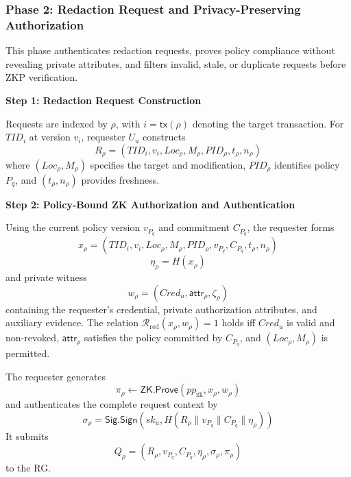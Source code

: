 \documentclass[lettersize,journal]{IEEEtran}
\begin{document}
\subsubsection*{\textbf{Phase 2: Redaction Request and Privacy-Preserving Authorization}}
\label{sec:phase2}

This phase authenticates redaction requests, proves policy compliance
without revealing private attributes, and filters invalid, stale, or
duplicate requests before ZKP verification.

\smallskip
\noindent\textbf{Step 1: Redaction Request Construction}

Requests are indexed by $\rho$, with $i=\mathsf{tx}(\rho)$ denoting the
target transaction. For $TID_i$ at version $v_i$, requester $U_u$ constructs
\begin{equation}
R_\rho=
(TID_i,v_i,Loc_\rho,M_\rho,PID_\rho,t_\rho,n_\rho)
\label{eq:redaction-request}
\end{equation}
where $(Loc_\rho,M_\rho)$ specifies the target and modification,
$PID_\rho$ identifies policy $P_q$, and $(t_\rho,n_\rho)$ provides
freshness.

\smallskip
\noindent\textbf{Step 2: Policy-Bound ZK Authorization and Authentication}

Using the current policy version $v_{P_q}$ and commitment $C_{P_q}$,
the requester forms
\begin{equation}
x_\rho
=(TID_i,v_i,Loc_\rho,M_\rho,PID_\rho,v_{P_q},C_{P_q},t_\rho,n_\rho)
\end{equation}
\begin{equation}
\eta_\rho=H(x_\rho)
\end{equation}
and private witness
\begin{equation}
w_\rho=(Cred_u,\mathsf{attr}_\rho,\zeta_\rho)
\label{eq:zk-witness}
\end{equation}
containing the requester's credential, private authorization attributes,
and auxiliary evidence. The relation
$\mathcal{R}_{\mathrm{red}}(x_\rho,w_\rho)=1$ holds iff $Cred_u$ is valid
and non-revoked, $\mathsf{attr}_\rho$ satisfies the policy committed by
$C_{P_q}$, and $(Loc_\rho,M_\rho)$ is permitted.

The requester generates
\begin{equation}
\pi_\rho\leftarrow
\mathsf{ZK.Prove}(pp_{\mathrm{zk}},x_\rho,w_\rho)
\label{eq:zk-proof}
\end{equation}
and authenticates the complete request context by
\begin{equation}
\sigma_\rho=
\mathsf{Sig.Sign}
\left(
sk_u,H(R_\rho\parallel v_{P_q}\parallel C_{P_q}\parallel\eta_\rho)
\right)
\label{eq:request-signature}
\end{equation}
It submits
\begin{equation}
Q_\rho=
(R_\rho,v_{P_q},C_{P_q},\eta_\rho,\sigma_\rho,\pi_\rho)
\label{eq:redaction-query}
\end{equation}
to the RG.
\end{document}
